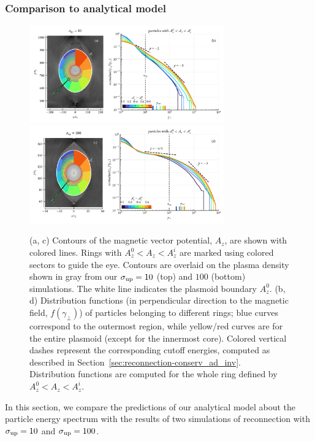 \subsubsection{Comparison to analytical model}
\begin{figure}[htb]
    \centering
    \includegraphics[width=0.75\textwidth]{figures/ch2-reconnection/fig8_1.pdf}
    \includegraphics[width=0.75\textwidth]{figures/ch2-reconnection/fig8_2.pdf}
    \caption{(a, c) Contours of the magnetic vector potential, $A_z$, are shown with colored lines. Rings with $A_z^0 < A_z < A_z^i$ are marked using colored sectors to guide the eye. Contours are overlaid on the plasma density shown in gray from our $\sigma_{\rm up}=10$ (top) and $100$ (bottom) simulations. The white line indicates the plasmoid boundary $A_z^0$. (b, d) Distribution functions (in perpendicular direction to the magnetic field, $f(\gamma_\perp)$) of particles belonging to different rings; blue curves correspond to the outermost region, while yellow/red curves are for the entire plasmoid (except for the innermost core). Colored vertical dashes represent the corresponding cutoff energies, computed as described in Section~\ref{sec:reconnection-conserv_ad_inv}. Distribution functions are computed for the whole ring defined by $A_z^0 < A_z < A_z^i$.}
    \label{fig:rec-layers_df}
\end{figure}
In this section, we compare the predictions of our analytical model about the particle energy spectrum with the results of two simulations of reconnection with $\sigma_{\rm up}=10$ and $\sigma_{\rm up} = 100$.

